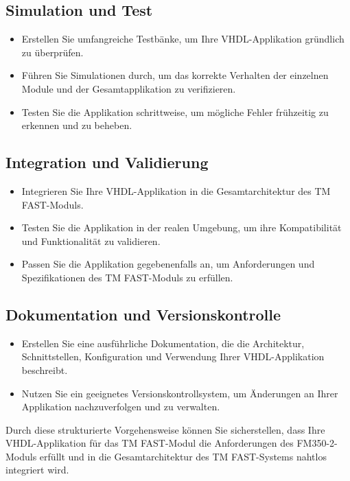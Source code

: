 \subsection*{Simulation und Test} 
\begin{itemize} 
    \item Erstellen Sie umfangreiche Testbänke, um Ihre VHDL-Applikation gründlich zu überprüfen. 
    \item Führen Sie Simulationen durch, um das korrekte Verhalten der einzelnen Module und der Gesamtapplikation zu verifizieren. 
    \item Testen Sie die Applikation schrittweise, um mögliche Fehler frühzeitig zu erkennen und zu beheben. 
\end{itemize}

\subsection*{Integration und Validierung} 
\begin{itemize} 
    \item Integrieren Sie Ihre VHDL-Applikation in die Gesamtarchitektur des TM FAST-Moduls. 
    \item Testen Sie die Applikation in der realen Umgebung, um ihre Kompatibilität und Funktionalität zu validieren. 
    \item Passen Sie die Applikation gegebenenfalls an, um Anforderungen und Spezifikationen des TM FAST-Moduls zu erfüllen. 
\end{itemize}

\subsection*{Dokumentation und Versionskontrolle} 
\begin{itemize} 
    \item Erstellen Sie eine ausführliche Dokumentation, die die Architektur, Schnittstellen, Konfiguration und Verwendung Ihrer 
    VHDL-Applikation beschreibt. 
    \item Nutzen Sie ein geeignetes Versionskontrollsystem, um Änderungen an Ihrer Applikation nachzuverfolgen und zu verwalten. 
\end{itemize}

Durch diese strukturierte Vorgehensweise können Sie sicherstellen, dass Ihre VHDL-Applikation für das TM FAST-Modul die 
Anforderungen des FM350-2-Moduls erfüllt und in die Gesamtarchitektur des TM FAST-Systems nahtlos integriert wird.